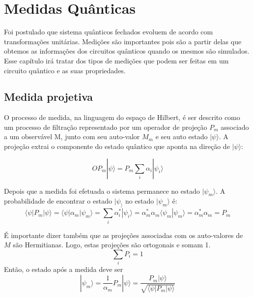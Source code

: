 \documentclass[tcc,capa]{texufpel}
\begin{document}
\chapter{Medidas Quânticas}
Foi postulado que sistema quânticos fechados evoluem de acordo com transformações unitárias. Medições são importantes pois são a partir delas que obtemos as informações dos circuitos quânticos quando os mesmos são simulados. Esse capítulo irá tratar dos tipos de medições que podem ser feitas em um circuito quântico e as suas propriedades.

\section{Medida projetiva}
O processo de medida, na linguagem do espaço de Hilbert, é ser descrito como um processo de filtração representado por um operador de projeção $P_m$ associado a um observável M, junto com seu auto-valor $M_m$ e seu auto estado $|\psi\rangle$. A projeção extrai o componente do estado quântico que aponta na direção de $|\psi\rangle$:

\begin{equation}O 
    P_m|\psi\rangle= P_m\sum\limits_{i}\alpha_i|\psi_i\rangle
\end{equation}

Depois que a medida foi efetuada o sistema permanece no estado $|\psi_m\rangle$.
A probabilidade de encontrar o estado $|\psi_\rangle$ no estado $|\psi_m\rangle$ é:
\begin{equation}
    \langle\psi|P_m|\psi\rangle= \langle\psi|\alpha_m|\psi_m\rangle 
    =\sum\limits_{i}\alpha_i^*|\psi_i\rangle
    =\alpha_m^*\alpha_m\langle\psi_m|\psi_m\rangle
    =\alpha_m^*\alpha_m=P_m
\end{equation}

É importante dizer também que as projeções associadas com os auto-valores de $M$ são Hermitianas. Logo, estas projeções são ortogonais e somam 1.
\begin{equation}
    \sum\limits_{i}P_i=1
\end{equation}
Então, o estado após a medida deve ser 
\begin{equation}
    |\psi_m\rangle= \frac{1}{\alpha_m}P_m|\psi\rangle =
    \frac{P_m|\psi\rangle}{\sqrt{\langle\psi|P_m|\psi\rangle}}
\end{equation}
\end{document}
